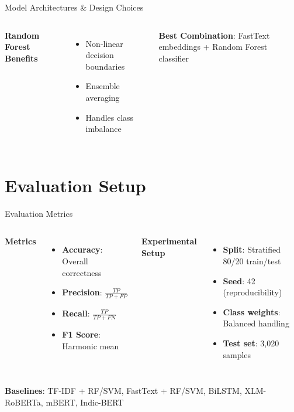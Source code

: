 \documentclass[aspectratio=169,xcolor=dvipsnames]{beamer}
\begin{document}
\begin{frame}{Model Architectures \& Design Choices}
\begin{columns}
        \textbf{Random Forest Benefits}
        \begin{itemize}
            \item Non-linear decision boundaries
            \item Ensemble averaging
            \item Handles class imbalance
        \end{itemize}
        
        \vspace{0.3cm}
        
        \textbf{Best Combination}: FastText embeddings + Random Forest classifier
    \end{columns}
\end{frame}


\section{Evaluation Setup}

\begin{frame}{Evaluation Metrics}
    \begin{columns}
        \textbf{Metrics}
        \begin{itemize}
            \item \textbf{Accuracy}: Overall correctness
            \item \textbf{Precision}: $\frac{TP}{TP+FP}$
            \item \textbf{Recall}: $\frac{TP}{TP+FN}$
            \item \textbf{F1 Score}: Harmonic mean
        \end{itemize}
        
        \textbf{Experimental Setup}
        \begin{itemize}
            \item \textbf{Split}: Stratified 80/20 train/test
            \item \textbf{Seed}: 42 (reproducibility)
            \item \textbf{Class weights}: Balanced handling
            \item \textbf{Test set}: 3,020 samples
        \end{itemize}
    \end{columns}
    
    \vspace{0.3cm}
    
    \textbf{Baselines}: TF-IDF + RF/SVM, FastText + RF/SVM, BiLSTM, XLM-RoBERTa, mBERT, Indic-BERT
\end{frame}
\end{document}
